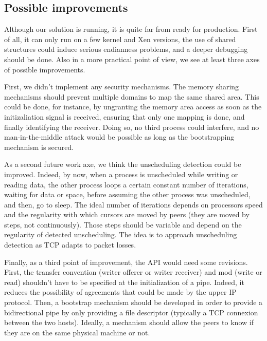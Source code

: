 \documentclass[journal]{IEEEtran}
\begin{document}
\subsection{Possible improvements}

Although our solution is running, it is quite far from ready for production. First of all, it can only run on a few kernel and Xen versions, the use of shared structures could induce serious endianness problems, and a deeper debugging should be done. Also in a more practical point of view, we see at least three axes of possible improvements.

First, we didn't implement any security mechanisms. The memory sharing mechanisms should prevent multiple domains to map the same shared area. This could be done, for instance, by ungranting the memory area access as soon as the initizaliation signal is received, ensuring that only one mapping is done, and finally identifying the receiver. Doing so, no third process could interfere, and no man-in-the-middle attack would be possible as long as the bootstrapping mechanism is secured. 

As a second future work axe, we think the unscheduling detection could be improved. Indeed, by now, when a process is unscheduled while writing or reading data, the other process loops a certain constant number of iterations, waiting for data or space, before assuming the other process was unscheduled, and then, go to sleep. The ideal number of iterations depends on processors speed and the regularity with which cursors are moved by peers (they are moved by steps, not continuously). Those steps should be variable and depend on the regularity of detected unscheduling. The idea is to approach unscheduling detection as TCP adapts to packet losses. 

Finally, as a third point of improvement, the API would need some revisions. First, the transfer convention (writer offerer or writer receiver) and mod (write or read) shouldn't have to be specified at the initialization of a pipe. Indeed, it reduces the possibility of agreements that could be made by the upper IP protocol. Then, a bootstrap mechanism should be developed in order to provide a bidirectional pipe by only providing a file descriptor (typically a TCP connexion between the two hosts). Ideally, a mechanism should allow the peers to know if they are on the same physical machine or not.



 
\end{document}
